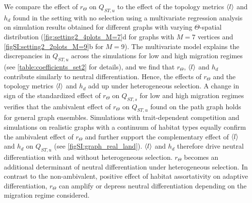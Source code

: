  We compare the effect of $r_\Theta$ on $Q_{ST,u}$ to the effect of the topology metrics $\langle l \rangle$ and $h_d$ found in the setting with no selection using a multivariate regression analysis on simulation results obtained for different graphs with varying $\Theta$-spatial distribution (\cref{fig:setting2_4plots_M=7}d for graphs with $M=7$ vertices and \cref{figSI:setting2_2plots_M=9}b for $M=9$).
  The multivariate model explains the discrepancies in $Q_{ST,u}$ across the simulations for low and high migration regimes (see \cref{table:coefficients_set2} for details), and we find that $r_\Theta$, $\langle l \rangle$ and $h_d$ contribute similarly to neutral differentiation.
  Hence, the effects of $r_\Theta$ and the topology metrics $\langle l \rangle$ and $h_d$ add up under heterogeneous selection. A change in sign of the standardized effect of $r_\Theta$ on $Q_{ST,s}$ for low and high migration regimes verifies that the ambivalent effect of $r_\Theta$ on $Q_{ST,u}$ found on the path graph holds for general graph ensembles. 
  Simulations with trait-dependent competition and simulations on realistic graphs with a continuum of habitat types equally confirm the ambivalent effect of $r_\Theta$ and further support the complementary effect of $\langle l \rangle$ and $h_d$ on $Q_{ST,u}$ (see \cref{figSI:graph_real_land}).
  $\langle l \rangle$ and $h_d$ therefore drive neutral differentiation with and without heterogeneous selection. $r_\Theta$ becomes an additional determinant of neutral differentiation under heterogeneous selection. In contrast to the non-ambivalent, positive effect of habitat assortativity on adaptive differentiation, $r_\Theta$ can amplify or depress neutral differentiation depending on the migration regime considered.
  
